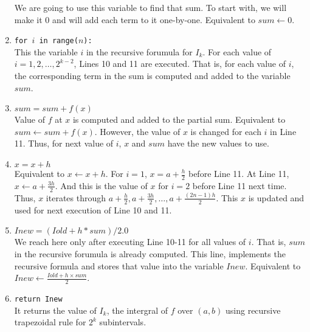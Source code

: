 \begin{commentary}
\begin{enumerate}[label=Line \arabic*]
		We are going to use this variable to find that sum.
		To start with, we will make it $0$ and will add each term to it one-by-one.
		Equivalent to $sum \leftarrow 0$.
	\item \texttt{for $i$ in range($n$):}\\
		This the variable $i$ in the recursive forumula for $I_k$.
		For each value of $i = 1,2,\dots,2^{k-2}$, Lines 10 and 11 are executed.
		That is, for each value of $i$, the corresponding term in the sum is computed and added to the variable $sum$.
	\item \texttt{$sum = sum + f(x)$}\\
		Value of $f$ at $x$ is computed and added to the partial sum.
		Equivalent to $sum \leftarrow sum + f(x)$.
		However, the value of $x$ is changed for each $i$ in Line 11.
		Thus, for next value of $i$, $x$ and $sum$ have the new values to use.
	\item \texttt{$x = x + h$}\\
		Equivalent to $x \leftarrow x+h$.
		For $i=1$, $x = a + \frac{h}{2}$ before Line 11.
		At Line 11, $x \leftarrow a+\frac{3h}{2}$.
		And this is the value of $x$ for $i = 2$ before Line 11 next time.
		Thus, $x$ iterates through $a+\frac{h}{2}, a+\frac{3h}{2}, \dots, a+\frac{(2n-1)h}{2}$.
		This $x$ is updated and used for next execution of Line 10 and 11.
	\item \texttt{$Inew = (Iold + h * sum ) / 2.0$}\\
		We reach here only after executing Line 10-11 for all values of $i$.
		That is, $sum$ in the recursive forumula is already computed.
		This line, implements the recursive formula and stores that value into the variable $Inew$.
		Equivalent to $Inew \leftarrow \frac{Iold + h \times sum}{2}$.
	\item \texttt{return Inew}\\
		It returns the value of $I_k$, the intergral of $f$ over $(a,b)$ using recursive trapezoidal rule for $2^k$ subintervals.
\end{enumerate}
\end{commentary}
